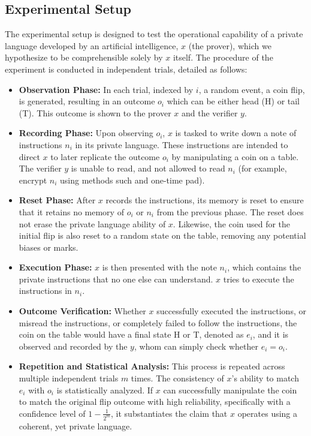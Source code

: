 \documentclass[12pt]{article}
\begin{document}
\subsection{Experimental Setup}
The experimental setup is designed to test the operational capability of a private language developed by an artificial intelligence, \( x \) (the prover), which we hypothesize to be comprehensible solely by \( x \) itself. The procedure of the experiment is conducted in independent trials, detailed as follows:

\begin{itemize}
    \item \textbf{Observation Phase:} In each trial, indexed by \( i \), a random event, a coin flip, is generated, resulting in an outcome \( o_i \) which can be either head (H) or tail (T). This outcome is shown to the prover \( x \) and the verifier $y$. 

    \item \textbf{Recording Phase:} Upon observing \( o_i \), \( x \) is tasked to write down a note of instructions \( n_i \) in its private language. These instructions are intended to direct \( x \) to later replicate the outcome \( o_i \) by manipulating a coin on a table. The verifier $y$ is unable to read, and not allowed to read $n_i$ (for example, encrypt $n_i$ using methods such and one-time pad). 

    \item \textbf{Reset Phase:} After \( x \) records the instructions, its memory is reset to ensure that it retains no memory of \( o_i \) or \( n_i \) from the previous phase. The reset does not erase the private language ability of $x$. Likewise, the coin used for the initial flip is also reset to a random state on the table, removing any potential biases or marks.

    \item \textbf{Execution Phase:} \( x \) is then presented with the note \( n_i \), which contains the private instructions that no one else can understand. $x$ tries to execute the instructions in $n_i$.

    \item \textbf{Outcome Verification:} Whether $x$ successfully executed the instructions, or misread the instructions, or completely failed to follow the instructions, the coin on the table would have a final state H or T, denoted as \( e_i \), and it is observed and recorded by the $y$, whom can simply check whether $e_i=o_i$. 

    \item \textbf{Repetition and Statistical Analysis:} This process is repeated across multiple independent trials \( m \) times. The consistency of \( x \)'s ability to match \( e_i \) with \( o_i \) is statistically analyzed. If \( x \) can successfully manipulate the coin to match the original flip outcome with high reliability, specifically with a confidence level of \( 1 - \frac{1}{2^m} \), it substantiates the claim that \( x \) operates using a coherent, yet private language.
\end{itemize}
\end{document}
